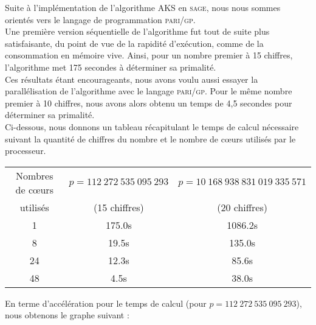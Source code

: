 \documentclass[11pt]{article}
\begin{document}
Suite à l'implémentation de l'algorithme AKS en \textsc{sage}, nous nous sommes orientés vers le langage de programmation \textsc{pari/gp}.\\

Une première version séquentielle de l'algorithme fut tout de suite plus satisfaisante, du point de vue de la rapidité d'exécution, comme de la consommation en mémoire vive. Ainsi, pour un nombre premier à 15 chiffres, l'algorithme met 175 secondes à déterminer sa primalité.\\

Ces résultats étant encourageants, nous avons voulu aussi essayer la parallélisation de l'algorithme avec le langage \textsc{pari/gp}. Pour le même nombre premier à 10 chiffres, nous avons alors obtenu un temps de 4,5 secondes pour déterminer sa primalité.\\

Ci-dessous, nous donnons un tableau récapitulant le temps de calcul nécessaire suivant la quantité de chiffres du nombre et le nombre de c\oe urs utilisés par le processeur.\\

\begin{center}
\begin{tabular}{|c|cc|}
\hline
Nombres de c\oe urs & $p=112\ 272\ 535\ 095\ 293$ & $p=10\ 168\ 938\ 831\ 019\ 335\ 571$\\
utilisés & (15 chiffres) & (20 chiffres)\\
\hline
1 & 175.0s & 1086.2s\\
8 & 19.5s & 135.0s\\
24 & 12.3s & 85.6s\\
48 & 4.5s & 38.0s\\
\hline
\end{tabular}
\end{center}

\newpage
En terme d'accélération pour le temps de calcul (pour $p=112\ 272\ 535\ 095\ 293$), nous obtenons le graphe suivant :

\begin{center}
\end{center}
\end{document}
